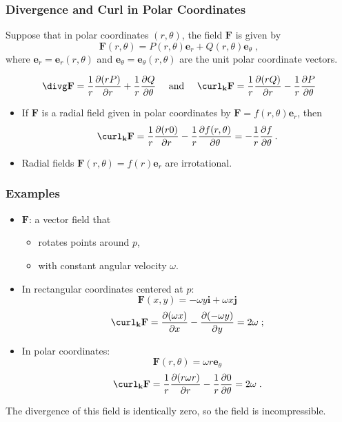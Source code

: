 \begin{frame}
  \frametitle{Divergence and Curl in Polar Coordinates}

Suppose that in polar coordinates $(r, \theta)$, the field $\textbf{F}$ is given by
%
$$\textbf{F}(r, \theta) = P(r, \theta) \textbf{e}_{r} + Q(r, \theta) \textbf{e}_{\theta} \; ,$$
%
where $\textbf{e}_{r} = \textbf{e}_{r}(r, \theta)$ and $\textbf{e}_{\theta}=\textbf{e}_{\theta}(r, \theta)$ are the unit polar coordinate vectors.

%
$$\divg \textbf{F} =  \frac{1}{r} \frac{\partial (r P)}{\partial r} + \frac{1}{r} \frac{\partial Q}{\partial \theta} \quad \text{ and } \quad
   \curl_{\textbf{k}} \textbf{F} =  \frac{1}{r} \frac{\partial (r Q)}{\partial r} - \frac{1}{r} \frac{\partial P}{\partial \theta}
$$

\begin{itemize}
  \item \pause If $\textbf{F}$ is a radial field given in polar coordinates by $\textbf{F} = f(r,\theta)\textbf{e}_r$, then
%
$$\curl_{\textbf{k}} \textbf{F} = \frac{1}{r} \frac{\partial (r 0)}{\partial r} - \frac{1}{r}\frac{\partial f(r,\theta)}{\partial \theta} = - \frac{1}{r} \frac{\partial f}{\partial \theta} \, .$$
\item \pause Radial fields $\textbf{F}(r,\theta) = f(r)\textbf{e}_r$ are irrotational.
\end{itemize}

\end{frame}


\begin{frame}
  \frametitle{Examples}

\begin{itemize}
  \item $\textbf{F}$: a vector field that
  \begin{itemize}
    \item rotates points around $p$,
    \item with constant angular velocity $\omega$.
  \end{itemize}
  \item \pause In rectangular coordinates centered at $p$:
  $$\textbf{F}(x,y) = -\omega y \textbf{i} + \omega x \textbf{j}$$
  $$\curl_{\textbf{k}} \textbf{F} = \frac{\partial (\omega x)}{\partial x} - \frac{\partial (-\omega y)}{\partial y} = 2\omega \; ;$$
  \item \pause In polar coordinates:
  $$\textbf{F}(r, \theta) = \omega r \textbf{e}_{\theta}$$
$$\curl_{\textbf{k}} \textbf{F} = \frac{1}{r}\frac{\partial (r \omega r)}{\partial r} - \frac{1}{r}\frac{\partial 0}{\partial \theta} = 2\omega \; .$$
\end{itemize}

\pause The divergence of this field is identically zero, so the field is incompressible.

\end{frame}

